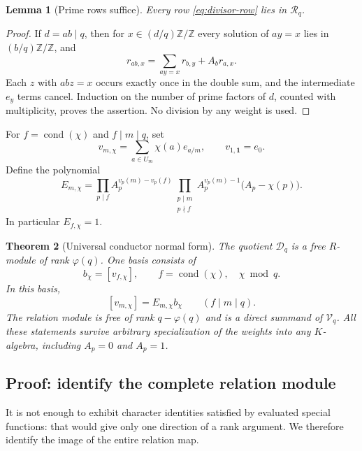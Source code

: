 \documentclass[11pt]{article}
\numberwithin{equation}{section}
\newtheorem{theorem}{Theorem}[section]
\newtheorem{lemma}[theorem]{Lemma}
\theoremstyle{definition}
\theoremstyle{remark}
\DeclareMathOperator{\cond}{cond}
\newcommand{\Z}{\mathbb Z}
\newcommand{\V}{\mathcal V}
\newcommand{\D}{\mathcal D}
\begin{document}
\begin{lemma}[Prime rows suffice]\label{lem:prime-suffice}
Every row \eqref{eq:divisor-row} lies in $\mathcal R_q$.
\end{lemma}
\begin{proof}
If $d=ab\mid q$, then for $x\in(d/q)\Z/\Z$ every solution of $ay=x$
lies in $(b/q)\Z/\Z$, and
\[
 r_{ab,x}=\sum_{ay=x}r_{b,y}+A_b r_{a,x}.
\]
Each $z$ with $abz=x$ occurs exactly once in the double sum, and the
intermediate $e_y$ terms cancel. Induction on the number of prime factors
of $d$, counted with multiplicity, proves the assertion. No division by
any weight is used.
\end{proof}

For $f=\cond(\chi)$ and $f\mid m\mid q$, set
\begin{equation}\label{eq:v-character}
 v_{m,\chi}=\sum_{a\in U_m}\chi(a)e_{a/m},
 \qquad v_{1,\mathbf1}=e_0.
\end{equation}
Define the polynomial
\begin{equation}\label{eq:E-polynomial}
 E_{m,\chi}=
 \prod_{p\mid f}A_p^{v_p(m)-v_p(f)}
 \prod_{\substack{p\mid m\\p\nmid f}}
 A_p^{v_p(m)-1}\bigl(A_p-\chi(p)\bigr).
\end{equation}
In particular $E_{f,\chi}=1$.

\begin{theorem}[Universal conductor normal form]\label{thm:universal}
The quotient $\D_q$ is a free $R$-module of rank $\varphi(q)$.
One basis consists of
\[
 b_\chi=[v_{f,\chi}],\qquad f=\cond(\chi),\quad \chi\bmod q.
\]
In this basis,
\begin{equation}\label{eq:conductor-normal}
 [v_{m,\chi}]=E_{m,\chi}b_\chi\qquad(f\mid m\mid q).
\end{equation}
The relation module is free of rank $q-\varphi(q)$ and is a direct
summand of $\V_q$. All these statements survive arbitrary specialization
of the weights into any $K$-algebra, including $A_p=0$ and $A_p=1$.
\end{theorem}

\subsection{Proof: identify the complete relation module}
It is not enough to exhibit character identities satisfied by evaluated
special functions: that would give only one direction of a rank argument.
We therefore identify the image of the entire relation map.
\end{document}
